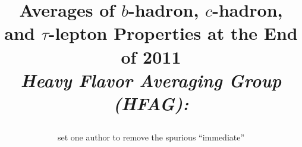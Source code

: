 \documentclass[12pt,twoside]{article}
\begin{document}
\setcounter{page}{1}
\thispagestyle{empty}
\renewcommand\Affilfont{\itshape\small}

\title{
  Averages of $b$-hadron, $c$-hadron, and $\tau$-lepton Properties at the End of 2011 \\
  \vskip0.20in
  \large{\it Heavy Flavor Averaging Group (HFAG):}
\author{set one author to remove the spurious ``immediate''}
}
\end{document}
